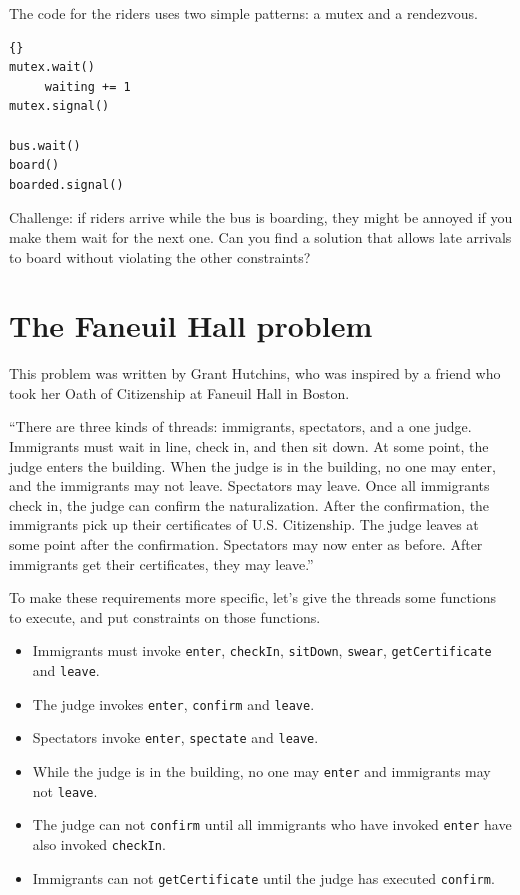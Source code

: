 \documentclass{book}
\newcommand{\clearemptydoublepage}{\newpage\cleardoublepage}
\begin{document}
The code for the riders uses two
simple patterns: a mutex and a rendezvous.

\begin{lstlisting}[title={Bus problem solution (riders)}]{}
mutex.wait()
     waiting += 1
mutex.signal()

bus.wait()
board()
boarded.signal()
\end{lstlisting}

Challenge: if riders arrive while the bus is boarding, they
might be annoyed if you make them wait for the next one.  Can you
find a solution that allows late arrivals to board without violating
the other constraints?


\clearemptydoublepage
\section{The Faneuil Hall problem}

This problem was written by Grant Hutchins, who was inspired
by a friend who took her
Oath of Citizenship at Faneuil Hall in Boston.

``There are three kinds of threads: immigrants, spectators, and a one
judge.  Immigrants must wait in line, check in, and then sit down.  At
some point, the judge enters the building.  When the judge is in the
building, no one may enter, and the immigrants may not leave.
Spectators may leave.  Once all immigrants check in, the judge can
confirm the naturalization.  After the confirmation, the immigrants
pick up their certificates of U.S. Citizenship.  The judge leaves at
some point after the confirmation.  Spectators may now enter as
before.  After immigrants get their certificates, they may leave.''

To make these requirements more specific, let's give the threads
some functions to execute, and put constraints on those functions.

\begin{itemize}

\item Immigrants must invoke {\tt enter}, {\tt checkIn}, {\tt sitDown},
{\tt swear}, {\tt getCertificate} and {\tt leave}.

\item The judge invokes {\tt enter}, {\tt confirm} and {\tt leave}.

\item Spectators invoke {\tt enter}, {\tt spectate} and {\tt leave}.

\item While the judge is in the building, no one may {\tt enter}
and immigrants may not {\tt leave}.

\item The judge can not {\tt confirm} until all immigrants who have
invoked {\tt enter} have also invoked {\tt checkIn}.

\item Immigrants can not {\tt getCertificate} until the judge
has executed {\tt confirm}.

\end{itemize}
\end{document}
